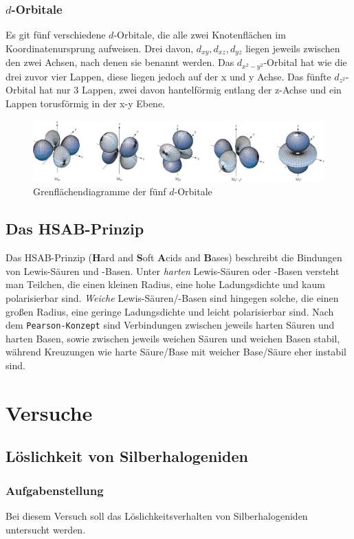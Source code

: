 \documentclass{scrartcl}
\begin{document}
\subsubsection{$d$-Orbitale}
Es git fünf verschiedene $d$-Orbitale, die alle zwei Knotenflächen im Koordinatenursprung aufweisen. Drei davon, $d_{xy}, d_{xz}, d_{yz}$ liegen jeweils zwischen den zwei Achsen, nach denen sie benannt werden. Das $d_{x^2-y^2}$-Orbital hat wie die drei zuvor vier Lappen, diese liegen jedoch auf der x und y Achse. Das fünfte $d_{z^2}$-Orbital hat nur 3 Lappen, zwei davon hantelförmig entlang der z-Achse und ein Lappen torusförmig in der x-y Ebene.  
\begin{figure}[h]
	\centering
	\caption{Grenflächendiagramme der fünf $d$-Orbitale\protect\footnotemark}
	\includegraphics[width=\textwidth]{d-Orbitale2.png}
\end{figure}
\subsection{Das HSAB-Prinzip}
Das HSAB-Prinzip (\textbf{H}ard and \textbf{S}oft \textbf{A}cids and \textbf{B}ases) beschreibt die Bindungen von Lewis-Säuren und -Basen. Unter \emph{harten} Lewis-Säuren oder -Basen versteht man Teilchen, die einen kleinen Radius, eine hohe Ladungsdichte und kaum polarisierbar sind. \emph{Weiche} Lewis-Säuren/-Basen sind hingegen solche, die einen großen Radius, eine geringe Ladungsdichte und leicht polarisierbar sind. Nach dem \texttt{Pearson-Konzept} sind Verbindungen zwischen jeweils harten Säuren und harten Basen, sowie zwischen jeweils weichen Säuren und weichen Basen stabil, während Kreuzungen wie harte Säure/Base mit weicher Base/Säure eher instabil sind. 
\section{Versuche}
 \subsection{Löslichkeit von Silberhalogeniden}
\subsubsection{Aufgabenstellung}
Bei diesem Versuch soll das Löslichkeitsverhalten von Silberhalogeniden untersucht werden.
\end{document}
